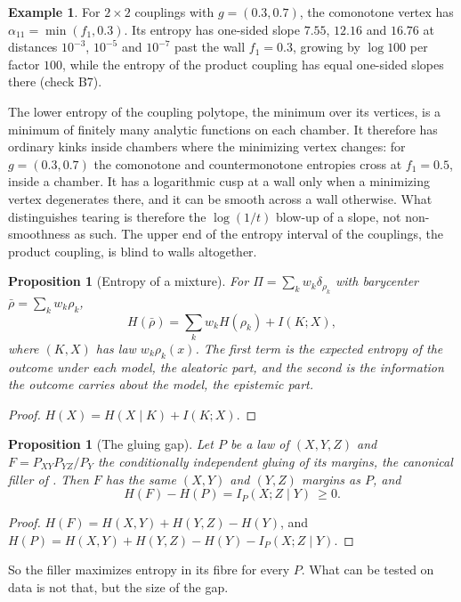 \documentclass[11pt]{article}
\newtheorem{proposition}[theorem]{Proposition}
\theoremstyle{definition}
\newtheorem{example}[theorem]{Example}
\theoremstyle{remark}
\begin{document}
\begin{example}
For $2\times2$ couplings with $g=(0.3,0.7)$, the comonotone vertex has $\alpha_{11}=\min(f_1,0.3)$. Its entropy has one-sided slope
$7.55$, $12.16$ and $16.76$ at distances $10^{-3}$, $10^{-5}$ and $10^{-7}$ past the wall $f_1=0.3$, growing by $\log100$ per factor
$100$, while the entropy of the product coupling has equal one-sided slopes there (check B7).
\end{example}

The lower entropy of the coupling polytope, the minimum over its vertices, is a minimum of finitely many analytic functions on
each chamber. It therefore has ordinary kinks inside chambers where the minimizing vertex changes: for $g=(0.3,0.7)$ the
comonotone and countermonotone entropies cross at $f_1=0.5$, inside a chamber. It has a logarithmic cusp at a wall only when a
minimizing vertex degenerates there, and it can be smooth across a wall otherwise. What distinguishes tearing is therefore the
$\log(1/t)$ blow-up of a slope, not non-smoothness as such. The upper end of the entropy interval of the couplings, the product
coupling, is blind to walls altogether.

\begin{proposition}[Entropy of a mixture]\label{prop:level2}
For $\Pi=\sum_kw_k\delta_{\rho_k}$ with barycenter $\bar\rho=\sum_kw_k\rho_k$,
\[
H(\bar\rho)=\sum_kw_kH(\rho_k)+I(K;X),
\]
where $(K,X)$ has law $w_k\rho_k(x)$. The first term is the expected entropy of the outcome under each model, the aleatoric
part, and the second is the information the outcome carries about the model, the epistemic part.
\end{proposition}
\begin{proof}
$H(X)=H(X\mid K)+I(K;X)$.
\end{proof}

\begin{proposition}[The gluing gap]\label{prop:gluinggap}
Let $P$ be a law of $(X,Y,Z)$ and $F=P_{XY}P_{YZ}/P_Y$ the conditionally independent gluing of its margins, the canonical filler
of \cite[Thm.~4.2]{Conditionals}. Then $F$ has the same $(X,Y)$ and $(Y,Z)$ margins as $P$, and
\[
H(F)-H(P)=I_P(X;Z\mid Y)\ \ge0 .
\]
\end{proposition}
\begin{proof}
$H(F)=H(X,Y)+H(Y,Z)-H(Y)$, and $H(P)=H(X,Y)+H(Y,Z)-H(Y)-I_P(X;Z\mid Y)$.
\end{proof}

So the filler maximizes entropy in its fibre for every $P$. What can be tested on data is not that, but the size of the gap.
\end{document}
